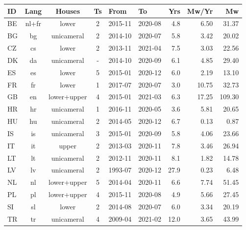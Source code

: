 \begin{tabular}{l|c|c|cllr|rr}
ID&Lang&Houses&Ts&From&To&Yrs&Mw/Yr&Mw\\
\hline
BE&nl+fr&lower&2&2015-11&2020-08&4.8&6.50&31.37\\
BG&bg&unicameral&2&2014-10&2020-07&5.8&3.42&20.02\\
CZ&cs&lower&2&2013-11&2021-04&7.5&3.03&22.56\\
DK&da&unicameral&-&2014-10&2020-09&6.1&4.85&29.40\\
ES&es&lower&5&2015-01&2020-12&6.0&2.19&13.10\\
FR&fr&lower&1&2017-07&2020-07&3.0&10.75&32.73\\
GB&en&lower+upper&4&2015-01&2021-03&6.3&17.25&109.30\\
HR&hr&unicameral&1&2016-11&2020-05&3.6&5.81&20.65\\
HU&hu&unicameral&2&2014-05&2020-12&6.7&0.13&0.87\\
IS&is&unicameral&3&2015-01&2020-09&5.8&4.06&23.66\\
IT&it&upper&2&2013-03&2020-11&7.8&3.46&26.94\\
LT&lt&unicameral&2&2012-11&2020-11&8.1&1.82&14.78\\
LV&lv&unicameral&2&1993-07&2020-12&27.9&0.23&6.48\\
NL&nl&lower+upper&5&2014-04&2020-11&6.6&7.74&51.45\\
PL&pl&lower+upper&4&2015-11&2020-08&4.9&5.66&27.45\\
SI&sl&lower&2&2014-08&2020-07&6.0&3.34&20.19\\
TR&tr&unicameral&4&2009-04&2021-02&12.0&3.65&43.99\\
\end{tabular}
